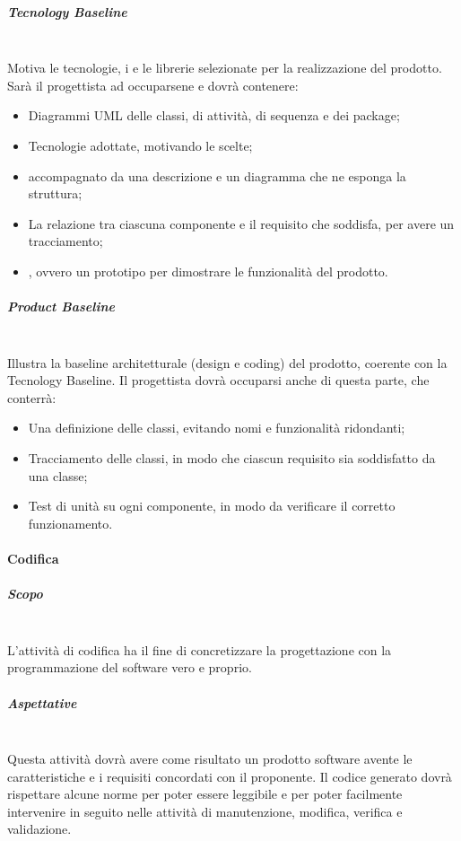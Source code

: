 \subparagraph{Tecnology Baseline} \mbox{} \\
Motiva le tecnologie, i  e le librerie selezionate per la realizzazione del prodotto. Sarà il progettista ad occuparsene e dovrà contenere:
\begin{itemize}
\item Diagrammi UML delle classi, di attività, di sequenza e dei package;
\item Tecnologie adottate, motivando le scelte;
\item {} accompagnato da una descrizione e un diagramma che ne esponga la struttura;
\item La relazione tra ciascuna componente e il requisito che soddisfa, per avere un tracciamento;  
\item {}, ovvero un prototipo per dimostrare le funzionalità del prodotto.
\end{itemize}
\subparagraph{Product Baseline} \mbox{} \\
Illustra la baseline architetturale (design e coding) del prodotto, coerente con la Tecnology Baseline. Il progettista dovrà occuparsi anche di questa parte, che conterrà:
\begin{itemize}
\item Una definizione delle classi, evitando nomi e funzionalità ridondanti;
\item Tracciamento delle classi, in modo che ciascun requisito sia soddisfatto da una classe;
\item Test di unità su ogni componente, in modo da verificare il corretto funzionamento.
\end{itemize}
\paragraph{Codifica}

\subparagraph{Scopo}  \mbox{} \\
L'attività di codifica ha il fine di concretizzare la progettazione con la programmazione del software vero e proprio.

\subparagraph{Aspettative} \mbox{} \\
Questa attività dovrà avere come risultato un prodotto software avente le caratteristiche e i requisiti concordati con il proponente. Il codice generato dovrà rispettare alcune norme per poter essere leggibile e per poter facilmente intervenire in seguito nelle attività di manutenzione, modifica, verifica e validazione.

